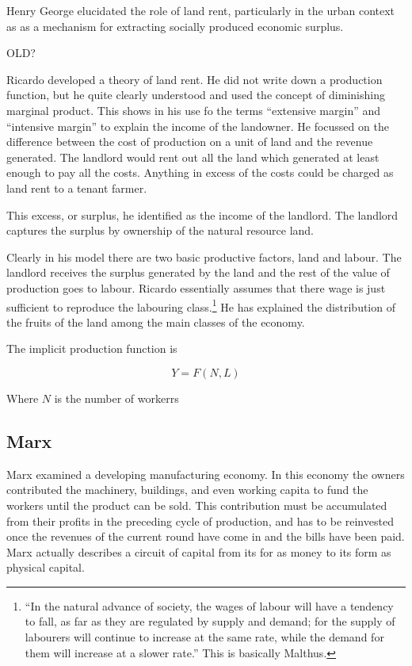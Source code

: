  Henry George elucidated the role of land rent, particularly in the urban context as as a mechanism for extracting socially produced economic surplus.  

OLD?
 
Ricardo developed a theory of land rent. He did not write down a production function, but he quite clearly understood and used the concept of diminishing marginal product. This shows in his use fo the terms ``extensive margin'' and ``intensive margin'' to explain the income of the landowner. He focussed on the difference between the cost of production on a unit of land and the revenue generated. The landlord would rent out all the land which generated at least enough to pay all the costs. Anything in excess of the costs could be charged as land rent to a tenant farmer.

This excess, or surplus, he identified as the income of the landlord. The landlord captures the surplus by ownership of the natural resource land. 

Clearly in his model there are two basic productive factors, land and labour. The landlord  receives the surplus generated by the land and the rest of the value of production goes to labour. Ricardo essentially assumes that there wage is  just sufficient to reproduce the labouring class.\footnote{ ``In the natural advance of society, the wages of labour will have a tendency to fall, as far as they are regulated by supply and demand; for the supply of labourers will continue to increase at the same rate, while the demand for them will increase at a slower rate.''  This is  basically Malthus.} He has explained the distribution of the fruits of the land among the main classes of the economy.

The implicit production function is

\[Y=F(N, L)\]

Where $N$ is the number of workerrs

\subsection{Marx}
 Marx examined a developing manufacturing economy. In this economy the owners contributed the machinery, buildings, and even working capita to fund the workers until the product can be sold. This contribution must be accumulated from their profits in the preceding cycle of production,  and has to be reinvested once the revenues of the current round have come in and the bills have been paid. Marx actually describes a circuit of capital from its for as money to its form as physical capital. 
 

